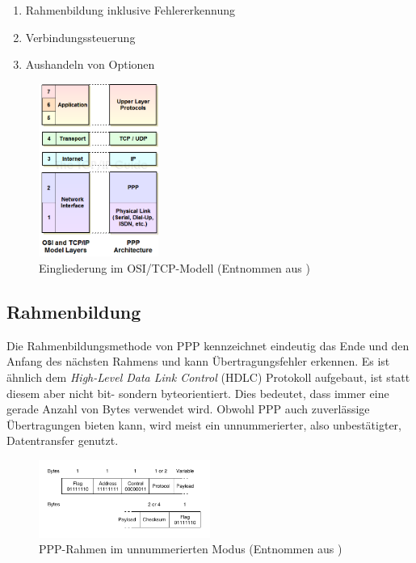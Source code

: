 \documentclass[journal,11pt]{IEEEtran}
\begin{document}
\begin{enumerate}
    \item Rahmenbildung inklusive Fehlererkennung
    \item Verbindungssteuerung
    \item Aushandeln von Optionen
\end{enumerate}

\begin{figure}[h!]
 \centering
  \includegraphics[width=0.35\textwidth]{img/ppplayers}
 \caption{Eingliederung im OSI/TCP-Modell (Entnommen aus \cite{ppposi})}
 \label{fig:osi}
\end{figure}

\subsection{Rahmenbildung}
Die Rahmenbildungsmethode von PPP kennzeichnet eindeutig das Ende und den Anfang des nächsten Rahmens und kann Übertragungsfehler erkennen. Es ist ähnlich dem \textit{High-Level Data Link Control} (HDLC) Protokoll aufgebaut, ist statt diesem aber nicht bit- sondern byteorientiert. Dies bedeutet, dass immer eine gerade Anzahl von Bytes verwendet wird. Obwohl PPP auch zuverlässige Übertragungen bieten kann, wird meist ein unnummerierter, also unbestätigter, Datentransfer genutzt.

\begin{figure}[h!]
 \centering
  \includegraphics[width=0.5\textwidth]{img/ppprahmen}
 \caption{PPP-Rahmen im unnummerierten Modus (Entnommen aus \cite{compnetzw})}
 \label{fig:ppprahmen}
\end{figure}
\end{document}
